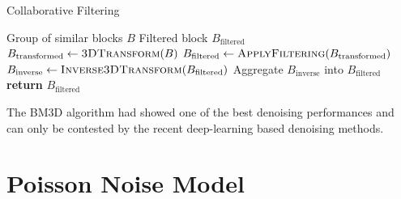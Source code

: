\begin{algorithm}
    \caption{Collaborative Filtering}\label{alg:collaborativefiltering}
    \begin{algorithmic}[1]
    \Require Group of similar blocks $B$
    \Ensure Filtered block $B_{\text{filtered}}$
        \State $B_{\text{transformed}} \gets \textsc{3DTransform}(B)$
        \State $B_{\text{filtered}} \gets \textsc{ApplyFiltering}(B_{\text{transformed}})$ 
        \State $B_{\text{inverse}} \gets \textsc{Inverse3DTransform}(B_{\text{filtered}})$
        \State Aggregate $B_{\text{inverse}}$ into $B_{\text{filtered}}$
        \State \textbf{return} $B_{\text{filtered}}$
    \EndProcedure
    \end{algorithmic}
\end{algorithm}

The \gls{BM3D} algorithm had showed one of the best denoising performances and can only be contested by the recent deep-learning based denoising methods. 

\section{Poisson Noise Model}\label{sec:poisson-noise-model}

